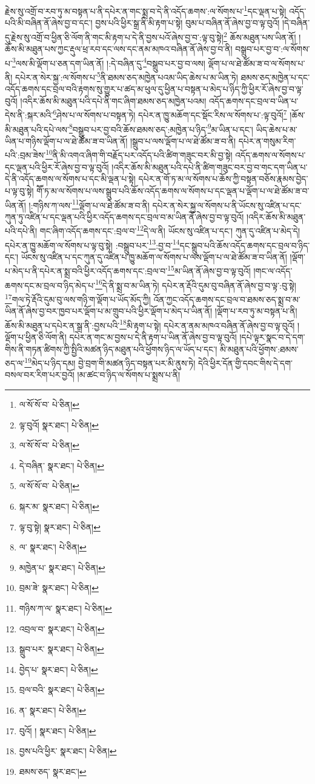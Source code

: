 རྗེས་སུ་འགྲོ་བ་རབ་ཏུ་མ་བསྟན་པ་ནི་དཔེར་ན་གང་སྨྲ་བ་དེ་ནི་འདོད་ཆགས་:ལ་སོགས་པ་\footnote{ལ་སོ་སོ་བ་  པེ་ཅིན། }དང་ལྡན་པ་སྟེ། འདོད་པའི་མི་བཞིན་ནོ་ཞེས་བྱ་བ་དང་། བྱས་པའི་ཕྱིར་སྒྲ་ནི་མི་རྟག་པ་སྟེ། བུམ་པ་བཞིན་ནོ་ཞེས་བྱ་བ་ལྟ་བུའོ། །དེ་བཞིན་དུ་རྗེས་སུ་འགྲོ་བ་ཕྱིན་ཅི་ལོག་ནི་གང་མི་རྟག་པ་དེ་ནི་བྱས་པའོ་ཞེས་བྱ་བ་:ལྟ་བུ་སྟེ།\footnote{ལྟ་བུའོ།  སྣར་ཐང་།  པེ་ཅིན། } ཆོས་མཐུན་པས་ཡིན་ནོ། །
ཆོས་མི་མཐུན་པས་ཀྱང་རྡུལ་ཕྲ་རབ་དང་ལས་དང་ནམ་མཁའ་བཞིན་ནོ་ཞེས་བྱ་བ་ནི། བསྒྲུབ་པར་བྱ་བ་:ལ་སོགས་པ་\footnote{ལ་སོ་སོ་བ་  པེ་ཅིན། }ལས་མི་ལྡོག་པ་ཅན་དག་ཡིན་ནོ། །:དེ་བཞིན་དུ་\footnote{དེ་བཞིན་  སྣར་ཐང་།  པེ་ཅིན། }བསྒྲུབ་པར་བྱ་བ་ལས། ལྡོག་པ་ལ་ཐེ་ཚོམ་ཟ་བ་ལ་སོགས་པ་ནི། དཔེར་ན་སེར་སྐྱ་:ལ་སོགས་པ་\footnote{ལ་སོ་སོ་བ་  པེ་ཅིན། }ནི་ཐམས་ཅད་མཁྱེན་པའམ་ཡིད་ཆེས་པ་མ་ཡིན་ཏེ། ཐམས་ཅད་མཁྱེན་པ་དང་འདོད་ཆགས་དང་བྲལ་བའི་རྟགས་སུ་གྱུར་པ་ཚད་མ་ཕུལ་དུ་ཕྱིན་པ་བསྟན་པ་མེད་པ་ཉིད་ཀྱི་ཕྱིར་རོ་ཞེས་བྱ་བ་ལྟ་བུའོ། །འདིར་ཆོས་མི་མཐུན་པའི་དཔེ་ནི་གང་ཞིག་ཐམས་ཅད་མཁྱེན་པའམ། འདོད་ཆགས་དང་བྲལ་བ་ཡིན་པ་དེས་ནི་:སྐར་མའི་\footnote{སྐར་མ་  སྣར་ཐང་།  པེ་ཅིན། }ཤེས་པ་ལ་སོགས་པ་བསྟན་ཏེ། དཔེར་ན་ཁྱུ་མཆོག་དང་སྡོང་རིས་ལ་སོགས་པ་:ལྟ་བུའོ།\footnote{ལྟ་བུ་སྟེ།  སྣར་ཐང་།  པེ་ཅིན། } །ཆོས་མི་མཐུན་པའི་དཔེ་ལས་\footnote{ལ་  སྣར་ཐང་།  པེ་ཅིན། }བསྒྲུབ་པར་བྱ་བའི་ཆོས་ཐམས་ཅད་:མཁྱེན་པ་ཉིད་\footnote{མཁྱེན་པ་  སྣར་ཐང་།  པེ་ཅིན། }མ་ཡིན་པ་དང་། ཡིད་ཆེས་པ་མ་ཡིན་པ་གཉིས་ལྡོག་པ་ལ་ཐེ་ཚོམ་ཟ་བ་ཡིན་ནོ། །སྒྲུབ་པ་ལས་ལྡོག་པ་ལ་ཐེ་ཚོམ་ཟ་བ་ནི། དཔེར་ན་གསུམ་རིག་པའི་:བྲམ་ཟེས་\footnote{བྲམ་ཟེ་  སྣར་ཐང་།  པེ་ཅིན། }ནི་མི་འགའ་ཞིག་གི་བརྗོད་པར་འདོད་པའི་ཚིག་གཟུང་བར་མི་བྱ་སྟེ། འདོད་ཆགས་ལ་སོགས་པ་དང་ལྡན་པའི་ཕྱིར་རོ་ཞེས་བྱ་བ་ལྟ་བུའོ། །འདིར་ཆོས་མི་མཐུན་པའི་དཔེ་ནི་ཚིག་གཟུང་བར་བྱ་བ་གང་དག་ཡིན་པ་དེ་ནི་འདོད་ཆགས་ལ་སོགས་པ་དང་མི་ལྡན་པ་སྟེ། དཔེར་ན་གོ་ཏ་མ་ལ་སོགས་པ་ཆོས་ཀྱི་བསྟན་བཅོས་རྣམས་བྱེད་པ་ལྟ་བུ་སྟེ། གཽ་ཏ་མ་ལ་སོགས་པ་ལས་སྒྲུབ་པའི་ཆོས་འདོད་ཆགས་ལ་སོགས་པ་དང་ལྡན་པ་ལྡོག་པ་ལ་ཐེ་ཚོམ་ཟ་བ་ཡིན་ནོ། །:གཉིས་ཀ་ལས་\footnote{གཉིས་ཀ་ལ་  སྣར་ཐང་།  པེ་ཅིན། }ལྡོག་པ་ལ་ཐེ་ཚོམ་ཟ་བ་ནི། དཔེར་ན་སེར་སྐྱ་ལ་སོགས་པ་ནི་ཡོངས་སུ་འཛིན་པ་དང་ཀུན་ཏུ་འཛིན་པ་དང་ལྡན་པའི་ཕྱིར་འདོད་ཆགས་དང་བྲལ་བ་མ་ཡིན་ནོ་ཞེས་བྱ་བ་ལྟ་བུའོ། །འདིར་ཆོས་མི་མཐུན་པའི་དཔེ་ནི། གང་ཞིག་འདོད་ཆགས་དང་:བྲལ་བ་\footnote{འབྲལ་བ་  སྣར་ཐང་།  པེ་ཅིན། }དེ་ལ་ནི། ཡོངས་སུ་འཛིན་པ་དང་། ཀུན་དུ་འཛིན་པ་མེད་དེ། དཔེར་ན་ཁྱུ་མཆོག་ལ་སོགས་པ་ལྟ་བུ་སྟེ། :བསྒྲུབ་པར་\footnote{སྒྲུབ་པར་  སྣར་ཐང་།  པེ་ཅིན། }:བྱ་བ་\footnote{བྱེད་པ་  སྣར་ཐང་།  པེ་ཅིན། }དང་སྒྲུབ་པའི་ཆོས་འདོད་ཆགས་དང་བྲལ་བ་ཉིད་དང་། ཡོངས་སུ་འཛིན་པ་དང་ཀུན་དུ་འཛིན་པ་ཁྱུ་མཆོག་ལ་སོགས་པ་ལས་ལྡོག་པ་ལ་ཐེ་ཚོམ་ཟ་བ་ཡིན་ནོ། །ལྡོག་པ་མེད་པ་ནི་དཔེར་ན་སྨྲ་བའི་ཕྱིར་འདོད་ཆགས་དང་:བྲལ་བ་\footnote{བྲལ་བའི་  སྣར་ཐང་།  པེ་ཅིན། }མ་ཡིན་ནོ་ཞེས་བྱ་བ་ལྟ་བུའོ། །གང་ལ་འདོད་ཆགས་དང་མ་བྲལ་བ་ཉིད་མེད་པ་\footnote{ན་  སྣར་ཐང་།  པེ་ཅིན། }དེ་ནི་སྨྲ་བ་མ་ཡིན་ཏེ། དཔེར་ན་རྡོའི་དུམ་བུ་བཞིན་ནོ་ཞེས་བྱ་བ་ལྟ་:བུ་སྟེ། \footnote{བུའོ། །   སྣར་ཐང་།  པེ་ཅིན། }གལ་ཏེ་རྡོའི་དུམ་བུ་ལས་གཉི་ག་ལྡོག་པ་ཡོད་མོད་ཀྱི། འོན་ཀྱང་འདོད་ཆགས་དང་བྲལ་བ་ཐམས་ཅད་སྨྲ་བ་མ་ཡིན་ནོ་ཞེས་བྱ་བར་ཁྱབ་པར་ལྡོག་པ་མ་གྲུབ་པའི་ཕྱིར་ལྡོག་པ་མེད་པ་ཡིན་ནོ། །ལྡོག་པ་རབ་ཏུ་མ་བསྟན་པ་ནི། ཆོས་མི་མཐུན་པ་དཔེར་ན་སྒྲ་ནི་:བྱས་པའི་\footnote{བྱས་པའི་ཕྱིར་  སྣར་ཐང་།  པེ་ཅིན། }མི་རྟག་པ་སྟེ། དཔེར་ན་ནམ་མཁའ་བཞིན་ནོ་ཞེས་བྱ་བ་ལྟ་བུའོ། །ལྡོག་པ་ཕྱིན་ཅི་ལོག་ནི། དཔེར་ན་གང་མ་བྱས་པ་དེ་ནི་རྟག་པ་ཡིན་ནོ་ཞེས་བྱ་བ་ལྟ་བུའོ། །དཔེ་ལྟར་སྣང་བ་དེ་དག་གིས་ནི་གཏན་ཚིགས་ཀྱི་སྤྱིའི་མཚན་ཉིད་མཐུན་པའི་ཕྱོགས་ཉིད་ལ་ཡོད་པ་དང་། མི་མཐུན་པའི་ཕྱོགས་:ཐམས་ཅད་ལ་\footnote{ཐམས་ཅད་  སྣར་ཐང་། }མེད་པ་ཉིད་དམ། བྱེ་བྲག་གི་མཚན་ཉིད་བསྟན་པར་མི་ནུས་ཏེ། དེའི་ཕྱིར་དོན་གྱི་དབང་གིས་དེ་དག་བསལ་བར་རིག་པར་བྱའོ། །མ་ཚང་བ་ཉིད་ལ་སོགས་པ་སྨྲས་པ་ནི། 